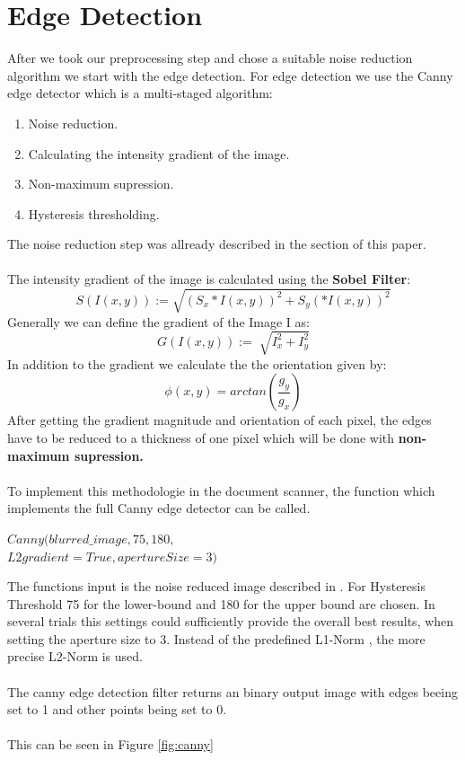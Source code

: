 \documentclass[twocolumn,10pt]{asme2ej}
\begin{document}
\section{Edge Detection}
\label{section:edgedetection}
\noindent
After we took our preprocessing step and chose a suitable noise reduction algorithm 
we start with the edge detection.
For edge detection we use the Canny edge\cite{canny_paper} detector which is a multi-staged algorithm:
\begin{enumerate}
    \item Noise reduction.
    \item Calculating the intensity gradient of the image.
    \item Non-maximum supression.
    \item Hysteresis thresholding.
\end{enumerate}
The noise reduction step was allready described in the  section of this paper.
\\\\
The intensity gradient of the image is calculated using the \textbf{Sobel Filter}:
\begin{equation}
    S(I(x,y)) :=\sqrt{(S_x*I(x,y))^2 + S_y(*I(x,y))^2}
\end{equation}
Generally we can define the gradient of the Image I as:
\begin{equation}
    G(I(x,y)) := \sqrt[]{I_x^2 +I_y^2}
\end{equation}
\noindent
In addition to the gradient we calculate the the orientation given by:
\begin{equation}
    \phi(x,y) = arctan(\frac{g_y}{g_x})
\end{equation}
After getting the gradient magnitude and orientation of each pixel, the edges have
to be reduced to a thickness of one pixel which will be done with \textbf{non-maximum supression.}
\\\\
\noindent
To implement this methodologie in the document scanner, the function
which implements the full Canny edge detector\cite{opencv_canny} can be called.
\begin{center}
    \noindent
    $Canny(blurred\_image,75, 180,$\\
    $L2gradient = True, apertureSize = 3)$
\end{center}
\noindent
The functions input is the noise reduced image described in .
For Hysteresis Threshold 75 for the lower-bound and 180 for the upper bound are chosen.
In several trials this settings could sufficiently provide the overall best results, 
when setting the aperture size to 3.
Instead of the predefined L1-Norm \cite{l1_norm}, the more precise L2-Norm\cite{l2_norm} is used.
\\\\
The canny edge detection filter returns an binary output image with edges
beeing set to 1 and other points being set to 0.
\\\\
This can be seen in Figure \ref{fig:canny}
\end{document}

